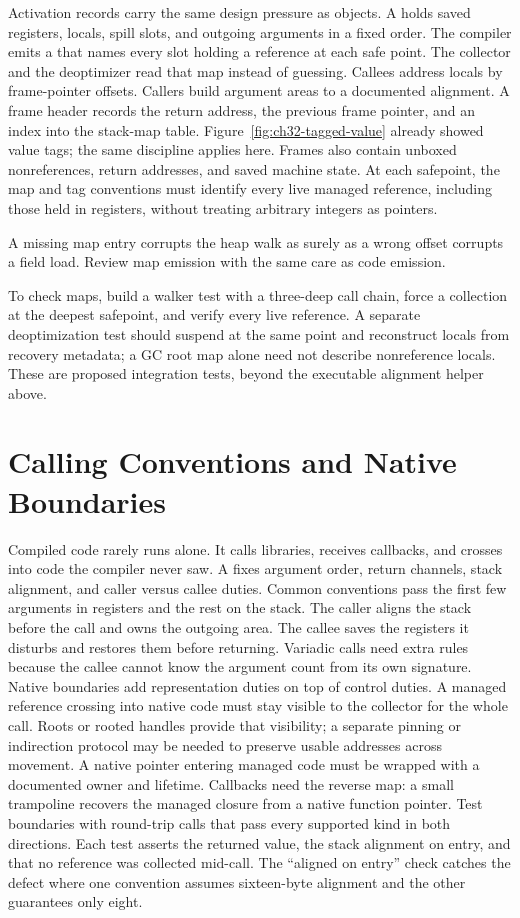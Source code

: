 Activation records carry the same design pressure as objects.
A  holds saved registers, locals, spill slots, and outgoing arguments in a fixed order.
The compiler emits a  that names every slot holding a reference at each safe point.
The collector and the deoptimizer read that map instead of guessing.
Callees address locals by frame-pointer offsets.
Callers build argument areas to a documented alignment.
A frame header records the return address, the previous frame pointer, and an index into the stack-map table.
Figure~\ref{fig:ch32-tagged-value} already showed value tags; the same discipline applies here.
Frames also contain unboxed nonreferences, return addresses, and saved machine state.
At each safepoint, the map and tag conventions must identify every live managed reference, including those held in registers, without treating arbitrary integers as pointers.
\begin{ccnote}
A missing map entry corrupts the heap walk as surely as a wrong offset corrupts a field load.
Review map emission with the same care as code emission.
\end{ccnote}
To check maps, build a walker test with a three-deep call chain, force a collection at the deepest safepoint, and verify every live reference.
A separate deoptimization test should suspend at the same point and reconstruct locals from recovery metadata; a GC root map alone need not describe nonreference locals.
These are proposed integration tests, beyond the executable alignment helper above.

\section{Calling Conventions and Native Boundaries}\label{sec:ch32-calling}

Compiled code rarely runs alone.
It calls libraries, receives callbacks, and crosses into code the compiler never saw.
A  fixes argument order, return channels, stack alignment, and caller versus callee duties.
Common conventions pass the first few arguments in registers and the rest on the stack.
The caller aligns the stack before the call and owns the outgoing area.
The callee saves the registers it disturbs and restores them before returning.
Variadic calls need extra rules because the callee cannot know the argument count from its own signature.
Native boundaries add representation duties on top of control duties.
A managed reference crossing into native code must stay visible to the collector for the whole call.
Roots or rooted handles provide that visibility; a separate pinning or indirection protocol may be needed to preserve usable addresses across movement.
A native pointer entering managed code must be wrapped with a documented owner and lifetime.
Callbacks need the reverse map: a small trampoline recovers the managed closure from a native function pointer.
Test boundaries with round-trip calls that pass every supported kind in both directions.
Each test asserts the returned value, the stack alignment on entry, and that no reference was collected mid-call.
The \enquote{aligned on entry} check catches the defect where one convention assumes sixteen-byte alignment and the other guarantees only eight.

